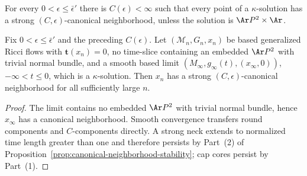 \begin{corollary}\label{cor:canonical-neighborhood-existence}
\label{kappacannbhd}
For every $0<\epsilon\leq\bar\epsilon'$ there is
$C(\epsilon)<\infty$ such that every point of a $\kappa$-solution
has a strong $(C,\epsilon)$-canonical neighborhood, unless the
solution is $\Ar P^2\times\Ar$.
\end{corollary}

\begin{corollary}\label{cor:canonical-neighborhood-limit-passage}
\label{limitcannbhd}
Fix $0<\epsilon\leq\bar\epsilon'$ and the preceding $C(\epsilon)$.
Let $(\mathcal M_n,G_n,x_n)$ be based generalized Ricci flows with
$\mathbf t(x_n)=0$, no time-slice containing an embedded
$\Ar P^2$ with trivial normal bundle, and a smooth based limit
$(M_\infty,g_\infty(t),(x_\infty,0))$, $-\infty<t\leq0$, which is
a $\kappa$-solution. Then $x_n$ has a strong
$(C,\epsilon)$-canonical neighborhood for all sufficiently large
$n$.
\end{corollary}
\begin{proof}
\sketch
{}
The limit contains no embedded $\Ar P^2$ with trivial normal
bundle, hence $x_\infty$ has a canonical neighborhood. Smooth
convergence transfers round components and $C$-components directly.
A strong neck extends to normalized time length greater than one and
therefore persists by Part~(2) of
Proposition~\ref{prop:canonical-neighborhood-stability}; cap cores
persist by Part~(1).
\end{proof}
